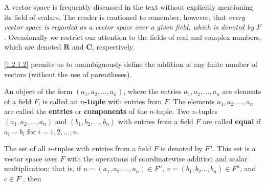 \begin{note}
    A vector space is frequently discussed in the text without explicitly mentioning its field of scalars.
    The reader is cautioned to remember, however, that \emph{every vector space is regarded as a vector space over a given field, which is denoted by $F$}.
    Occasionally we restrict our attention to the fields of real and complex numbers, which are denoted $\mathbf{R}$ and $\mathbf{C}$, respectively.
\end{note}

\begin{note}
    \ref{1.2.1.2} permits us to unambiguously define the addition of any finite number of vectors
    (without the use of parentheses).
\end{note}

\begin{definition}\label{def:1.2.3}
    An object of the form $(a_1, a_2,  \dots, a_n)$, where the entries $a_1, a_2, \dots, a_n$ are elements of a field $F$, is called an \textbf{$n$-tuple} with entries from $F$.
    The elements $a_1, a_2, \dots, a_n$ are called the \textbf{entries} or \textbf{components} of the $n$-tuple.
    Two $n$-tuples $(a_1, a_2, \dots, a_n)$ and $(b_1, b_2, \dots, b_n)$ with entries from a field $F$ are called \textbf{equal} if $a_i = b_i$ for $i = 1, 2, \dots, n$.
\end{definition}

\begin{example}\label{eg:1.2.1}
    The set of all $n$-tuples with entries from a field $F$ is denoted by $F^n$.
    This set is a vector space over $F$ with the operations of coordinatewise addition and scalar multiplication;
    that is, if $u = (a_1, a_2, \dots, a_n) \in F^n$, $v = (b_1, b_2  \dots, b_n) \in F^n$, and $c \in F$ , then
\end{example}
